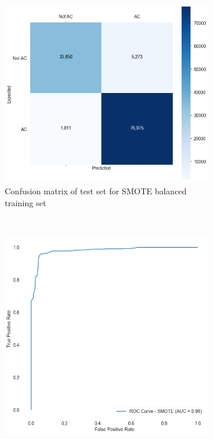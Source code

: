 \begin{figure}[H]
	\begin{subfigure}{\textwidth}
		\centering
		\includegraphics[scale=0.3]{./src/actAlerts/actalerts_smote_cm.png}
		\caption{Confusion matrix of test set for SMOTE balanced training set}\label{}
	\end{subfigure}\\
	\begin{subfigure}{.5\textwidth}
		\centering
		\includegraphics[scale=0.3]{./src/actAlerts/actalerts_smote_roc.png}

\end{subfigure}
\end{figure}
